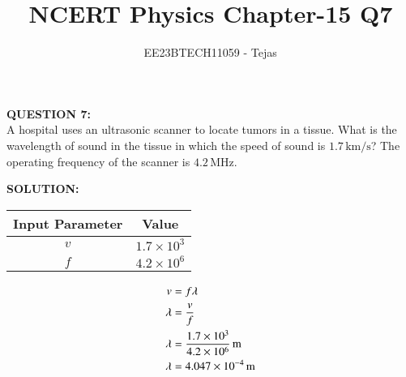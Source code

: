 \documentclass[journal,12pt,twocolumn]{IEEEtran}
\theoremstyle{remark}
\begin{document}


\vspace{3cm}

\title{NCERT Physics Chapter-15 Q7}
\author{EE23BTECH11059 - Tejas$^{}$}
\maketitle

\newpage

\Huge \textbf{QUESTION 7:} \\

\medskip
\Large
A hospital uses an ultrasonic scanner to locate tumors in a tissue. What is the
wavelength of sound in the tissue in which the speed of sound is $1.7 \, \text{km/s}$? The operating frequency of the scanner is $4.2 \, \text{MHz}$.

\bigskip
\Large
\textbf{SOLUTION:} \\
\begin{table}[h]
    \centering
    
    \begin{tabular}{|c|c|}
        \hline
        Input Parameter & Value \\
        \hline
        $v$ & $1.7\times10^3$ \\
        \hline
        $f$ & $4.2\times10^6$ \\
        \hline
        
    \end{tabular}
\end{table}
\begin{align}
v &= f \lambda \notag \\
\lambda &= \frac{v}{f} \notag \\
\lambda &= \frac{1.7 \times 10^3}{4.2 \times 10^6} \, \text{m} \notag \\
\lambda &= 4.047 \times 10^{-4} \, \text{m}
\end{align}



        
        
        
             
             
        

        













\renewcommand{\thefigure}{\theenumi}
\renewcommand{\thetable}{\theenumi}
\end{document}
